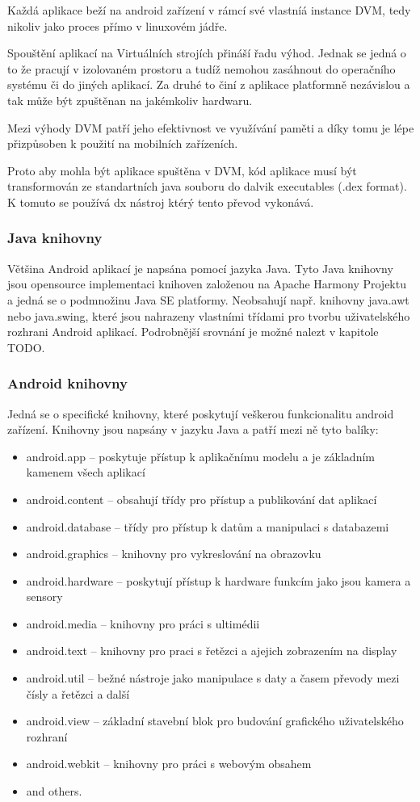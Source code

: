 Každá aplikace beží na android zařízení v rámcí své vlastníá instance DVM, tedy nikoliv jako proces přímo v linuxovém jádře.

Spouštění aplikací na Virtuálních strojích přináší řadu výhod.  Jednak se jedná o to že pracují v izolovaném prostoru a tudíž nemohou zasáhnout do operačního systému či do jiných aplikací. Za druhé to činí z aplikace platformně nezávislou a tak může být zpuštěnan na jakémkoliv hardwaru.

Mezi výhody DVM patří jeho efektivnost ve využívání paměti a díky tomu je lépe přizpůsoben k použití na mobilních zařízeních.

Proto aby mohla být aplikace spuštěna v DVM, kód aplikace musí být transformován ze standartních java souboru do dalvik executables (.dex format). K tomuto se používá dx nástroj ktérý tento převod vykonává.
\subsubsection{Java knihovny}
Většina Android aplikací je napsána pomocí jazyka Java. Tyto Java knihovny jsou opensource implementaci knihoven založenou na Apache Harmony Projektu a jedná se o podmnožinu Java SE platformy. Neobsahují např. knihovny java.awt nebo java.swing, které jsou nahrazeny vlastními třídami pro tvorbu uživatelského rozhrani Android aplikací. Podrobnější srovnání je možné nalezt v kapitole TODO. 
\subsubsection{Android knihovny}
Jedná se o specifické knihovny, které poskytují veškerou funkcionalitu android zařízení. Knihovny jsou napsány v jazyku Java a patří mezi ně tyto balíky:
\begin{itemize}
\item android.app -- poskytuje přístup k aplikačnímu modelu a je základním kamenem všech aplikací 
\item android.content -- obsahují třídy pro přístup a publikování dat aplikací
\item android.database -- třídy pro přístup k datům a manipulaci s databazemi
\item android.graphics -- knihovny pro vykreslování na obrazovku
\item android.hardware -- poskytují přístup k hardware funkcím jako jsou kamera a sensory
\item android.media -- knihovny pro práci s ultimédii
\item android.text -- knihovny pro praci s řetězci a ajejich zobrazením na display
\item android.util -- bežné nástroje jako manipulace s daty a časem převody mezi čísly a řetězci a další 
\item android.view -- základní stavební blok pro budování grafického uživatelského rozhraní
\item android.webkit -- knihovny pro práci s webovým obsahem
\item and others.
\end{itemize}

